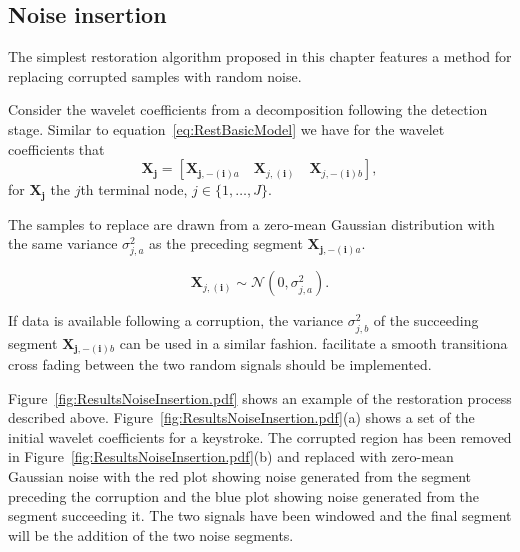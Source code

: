 \subsection{Noise insertion}
The simplest restoration algorithm proposed in this chapter features a method for replacing corrupted samples with random noise.

Consider the wavelet coefficients from a decomposition following the detection stage. Similar to equation~\ref{eq:RestBasicModel} we have for the wavelet coefficients that
\begin{equation}\label{eq:RestBasicModelWavelet1}
\boldsymbol{X_j} = \left[ \boldsymbol{X}_{\boldsymbol{j,-(i)}a}\quad\boldsymbol{X}_{j,\boldsymbol{(i)}}\quad\boldsymbol{X}_{j,\boldsymbol{-(i)}b} \right],
\end{equation}
for $\boldsymbol{X_j}$ the $j$th terminal node, $j \in \{1, \ldots, J\}$.

The samples to replace are drawn from a zero-mean Gaussian distribution with the same variance $\sigma^2_{j,a}$ as the preceding segment $\boldsymbol{X}_{\boldsymbol{j,-(i)}a}$.

\begin{equation}\label{eq:RestNoiseInsertionModelVariance1}
\boldsymbol{X}_{j,\boldsymbol{(i)}} \sim \mathcal{N}\left(0, \sigma^2_{j,a} \right).
\end{equation}

If data is available following a corruption, the variance $\sigma^2_{j,b}$ of the succeeding segment $\boldsymbol{X}_{\boldsymbol{j,-(i)}b}$ can be used in a similar fashion. \DIFdelbegin {}\DIFdelend \DIFaddbegin {}\DIFaddend facilitate a smooth transition\DIFaddbegin \DIFadd{, }\DIFaddend a cross fading between the two random signals should be implemented.

Figure~\ref{fig:ResultsNoiseInsertion.pdf} shows an example of the restoration process described above. Figure~\ref{fig:ResultsNoiseInsertion.pdf}(a) shows a set of the initial wavelet coefficients for a keystroke. The corrupted region has been removed in Figure~\ref{fig:ResultsNoiseInsertion.pdf}(b) and replaced with zero-mean Gaussian noise with the red plot showing noise generated from the segment preceding the corruption and the \DIFdelbegin {}\DIFdelend blue plot showing noise generated from the segment succeeding it. The two signals have been windowed and the final segment will be the addition of the two noise segments.

